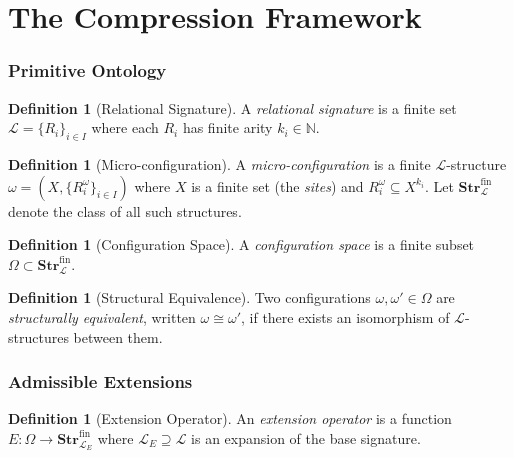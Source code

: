 \documentclass[11pt,a4paper]{article}
\theoremstyle{definition}
\newtheorem{definition}[theorem]{Definition}
\theoremstyle{remark}
\begin{document}
\newpage
\tableofcontents
\newpage

\part{The Compression Framework}

\section{Primitive Ontology}

\begin{definition}[Relational Signature]\label{def:sig}
A \emph{relational signature} is a finite set $\mathcal{L} = \{R_i\}_{i \in I}$ where each $R_i$ has finite arity $k_i \in \mathbb{N}$.
\end{definition}

\begin{definition}[Micro-configuration]\label{def:micro}
A \emph{micro-configuration} is a finite $\mathcal{L}$-structure $\omega = (X, \{R_i^\omega\}_{i \in I})$ where $X$ is a finite set (the \emph{sites}) and $R_i^\omega \subseteq X^{k_i}$. Let $\mathbf{Str}_{\mathcal{L}}^{\mathrm{fin}}$ denote the class of all such structures.
\end{definition}

\begin{definition}[Configuration Space]\label{def:config}
A \emph{configuration space} is a finite subset $\Omega \subset \mathbf{Str}_{\mathcal{L}}^{\mathrm{fin}}$.
\end{definition}

\begin{definition}[Structural Equivalence]\label{def:equiv}
Two configurations $\omega, \omega' \in \Omega$ are \emph{structurally equivalent}, written $\omega \cong \omega'$, if there exists an isomorphism of $\mathcal{L}$-structures between them.
\end{definition}

\section{Admissible Extensions}

\begin{definition}[Extension Operator]\label{def:ext}
An \emph{extension operator} is a function $E \colon \Omega \to \mathbf{Str}_{\mathcal{L}_E}^{\mathrm{fin}}$ where $\mathcal{L}_E \supseteq \mathcal{L}$ is an expansion of the base signature.
\end{definition}
\end{document}
